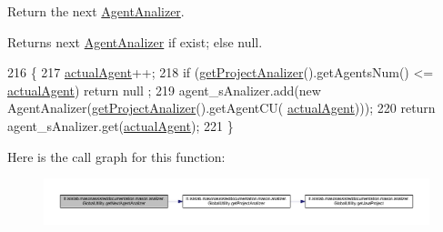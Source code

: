 Return the next \hyperlink{classit_1_1isislab_1_1masonassisteddocumentation_1_1mason_1_1analizer_1_1_agent_analizer}{Agent\-Analizer}. \begin{DoxyReturn}{Returns}
next \hyperlink{classit_1_1isislab_1_1masonassisteddocumentation_1_1mason_1_1analizer_1_1_agent_analizer}{Agent\-Analizer} if exist; else null. 
\end{DoxyReturn}

\begin{DoxyCode}
216                                                       \{
217         \hyperlink{classit_1_1isislab_1_1masonassisteddocumentation_1_1mason_1_1analizer_1_1_global_utility_ad969120645ce5135ca95177f6bb5ce42}{actualAgent}++;
218         \textcolor{keywordflow}{if} (\hyperlink{classit_1_1isislab_1_1masonassisteddocumentation_1_1mason_1_1analizer_1_1_global_utility_a78cbdc6022c558d1375a01095ad95659}{getProjectAnalizer}().getAgentsNum() <= \hyperlink{classit_1_1isislab_1_1masonassisteddocumentation_1_1mason_1_1analizer_1_1_global_utility_ad969120645ce5135ca95177f6bb5ce42}{actualAgent})    \textcolor{keywordflow}{return} null
      ;
219         agent\_sAnalizer.add(\textcolor{keyword}{new} AgentAnalizer(\hyperlink{classit_1_1isislab_1_1masonassisteddocumentation_1_1mason_1_1analizer_1_1_global_utility_a78cbdc6022c558d1375a01095ad95659}{getProjectAnalizer}().getAgentCU(
      \hyperlink{classit_1_1isislab_1_1masonassisteddocumentation_1_1mason_1_1analizer_1_1_global_utility_ad969120645ce5135ca95177f6bb5ce42}{actualAgent})));
220         \textcolor{keywordflow}{return} agent\_sAnalizer.get(\hyperlink{classit_1_1isislab_1_1masonassisteddocumentation_1_1mason_1_1analizer_1_1_global_utility_ad969120645ce5135ca95177f6bb5ce42}{actualAgent});     
221     \}
\end{DoxyCode}


Here is the call graph for this function\-:
\nopagebreak
\begin{figure}[H]
\begin{center}
\leavevmode
\includegraphics[width=350pt]{classit_1_1isislab_1_1masonassisteddocumentation_1_1mason_1_1analizer_1_1_global_utility_a896b97176587fd1761f482d49a6c7fd4_cgraph}
\end{center}
\end{figure}




